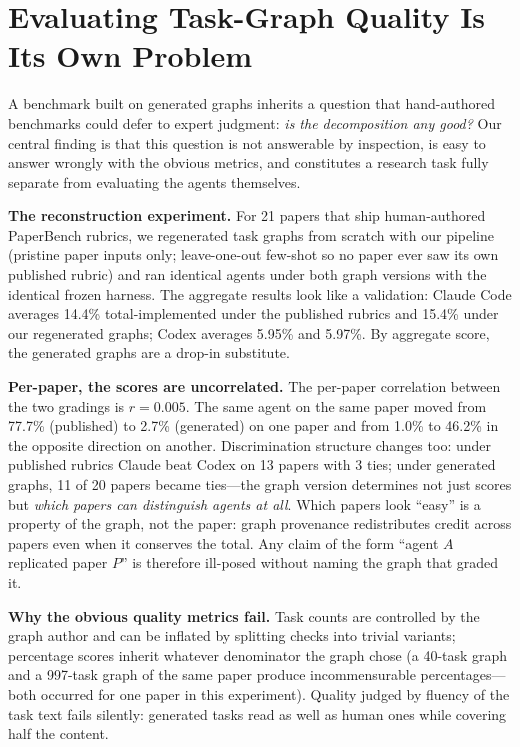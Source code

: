 \documentclass{article}
\begin{document}
\section{Evaluating Task-Graph Quality Is Its Own Problem}
\label{sec:graphquality}

A benchmark built on generated graphs inherits a question that hand-authored
benchmarks could defer to expert judgment: \emph{is the decomposition any
good?} Our central finding is that this question is not answerable by
inspection, is easy to answer wrongly with the obvious metrics, and
constitutes a research task fully separate from evaluating the agents
themselves.

\textbf{The reconstruction experiment.} For 21 papers that ship human-authored
PaperBench rubrics, we regenerated task graphs from scratch with our pipeline
(pristine paper inputs only; leave-one-out few-shot so no paper ever saw its
own published rubric) and ran identical agents under both graph versions with
the identical frozen harness. The aggregate results look like a validation:
Claude Code averages 14.4\% total-implemented under the published rubrics and
15.4\% under our regenerated graphs; Codex averages 5.95\% and 5.97\%. By
aggregate score, the generated graphs are a drop-in substitute.

\textbf{Per-paper, the scores are uncorrelated.} The per-paper correlation
between the two gradings is $r=0.005$. The same agent on the same paper moved
from 77.7\% (published) to 2.7\% (generated) on one paper and from 1.0\% to
46.2\% in the opposite direction on another. Discrimination structure changes
too: under published rubrics Claude beat Codex on 13 papers with 3 ties;
under generated graphs, 11 of 20 papers became ties---the graph version
determines not just scores but \emph{which papers can distinguish agents at
all}. Which papers look ``easy'' is a property of the graph, not the paper:
graph provenance redistributes credit across papers even when it conserves
the total. Any claim of the form ``agent $A$ replicated paper $P$'' is
therefore ill-posed without naming the graph that graded it.

\textbf{Why the obvious quality metrics fail.} Task counts are controlled by
the graph author and can be inflated by splitting checks into trivial
variants; percentage scores inherit whatever denominator the graph chose
(a 40-task graph and a 997-task graph of the same paper produce
incommensurable percentages---both occurred for one paper in this
experiment). Quality judged by fluency of the task text fails silently:
generated tasks read as well as human ones while covering half the content.
\end{document}
